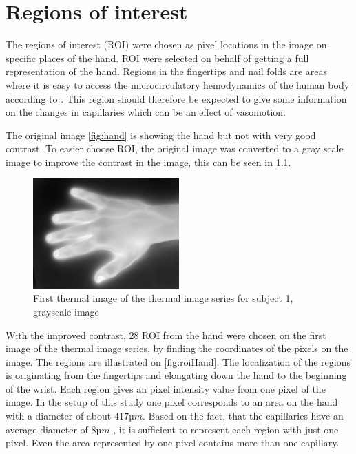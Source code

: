 \chapter{Regions of interest}

The regions of interest (ROI) were chosen as pixel locations in the image on specific places of the hand. ROI were selected on behalf of getting a full representation of the hand. 
Regions in the fingertips and nail folds are areas where it is easy to access the microcirculatory hemodynamics of the human body according to \cite{Iabichella2006}. This region should therefore be expected to give some information on the changes in capillaries which can be an effect of vasomotion. 

The original image \ref{fig:hand} is showing the hand but not with very good contrast. To easier choose ROI, the original image was converted to a gray scale image to improve the contrast in the image, this can be seen in \ref{fig:mat2grayHand}. 

\begin{figure}[H]
	\includegraphics[width=0.5\textwidth]{figures/mat2grayHand}  %
	\caption{First thermal image of the thermal image series for subject 1, grayscale image}
	\label{fig:mat2grayHand}  %
\end{figure}

With the improved contrast, 28 ROI from the hand were chosen on the first image of the thermal image series, by finding the coordinates of the pixels on the image. The regions are illustrated on \ref{fig:roiHand}. The localization of the regions is originating from the fingertips and elongating down the hand to the beginning of the wrist. Each region gives an pixel intensity value from one pixel of the image. In the setup of this study one pixel corresponds to an area on the hand with a diameter of about $417µm$. Based on the fact, that the capillaries have an average diameter of $8µm$ \cite{martini2012}, it is sufficient to represent each region with just one pixel. Even the area represented by one pixel contains more than one capillary.

